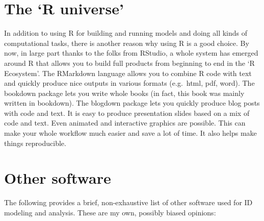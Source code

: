 \documentclass[]{book}
\theoremstyle{definition}
\theoremstyle{definition}
\theoremstyle{definition}
\theoremstyle{remark}
\begin{document}
\section{\texorpdfstring{The `R
universe'}{The R universe}}\label{the-r-universe}

In addition to using R for building and running models and doing all
kinds of computational tasks, there is another reason why using R is a
good choice. By now, in large part thanks to the folks from RStudio, a
whole system has emerged around R that allows you to build full products
from beginning to end in the `R Ecosystem'. The RMarkdown language
allows you to combine R code with text and quickly produce nice outputs
in various formats (e.g.~html, pdf, word). The bookdown package lets you
write whole books (in fact, this book was mainly written in bookdown).
The blogdown package lets you quickly produce blog posts with code and
text. It is easy to produce presentation slides based on a mix of code
and text. Even animated and interactive graphics are possible. This can
make your whole workflow much easier and save a lot of time. It also
helps make things reproducible.

\section{Other software}\label{other-software}

The following provides a brief, non-exhaustive list of other software
used for ID modeling and analysis. These are my own, possibly biased
opinions:
\end{document}
